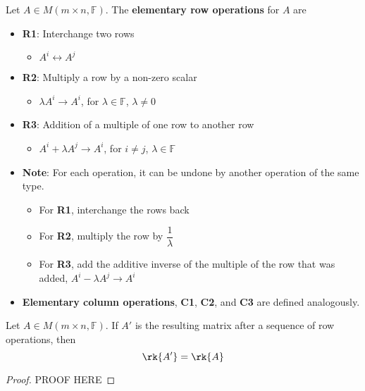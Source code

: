\documentclass[letterpaper,12pt]{article}
\begin{document}
\begin{definition}
Let $A \in M(m \times n, \mathbb{F})$. The \textbf{elementary row operations} for $A$ are
\begin{itemize}
    \item \textbf{R1}: Interchange two rows
    \begin{itemize}
        \item $A^i \leftrightarrow A^j$
    \end{itemize}
    \item \textbf{R2}: Multiply a row by a non-zero scalar
    \begin{itemize}
        \item $\lambda A^i \rightarrow A^i$, for $\lambda \in \mathbb{F}$, $\lambda \neq 0$
    \end{itemize}
    \item \textbf{R3}: Addition of a multiple of one row to another row
    \begin{itemize}
        \item $A^i + \lambda A^j \rightarrow A^i$, for $i \neq j$, $ \lambda \in \mathbb{F}$
    \end{itemize}
\end{itemize}

\begin{itemize}
    \item \textbf{Note}: For each operation, it can be undone by another operation of the same type.
    \begin{itemize}
        \item For \textbf{R1}, interchange the rows back
        \item For \textbf{R2}, multiply the row by $\dfrac{1}{\lambda}$
        \item For \textbf{R3}, add the additive inverse of the multiple of the row that was added, $A^i - \lambda A^j \rightarrow A^i$
    \end{itemize}
\end{itemize}

\begin{itemize}
    \item \textbf{Elementary column operations}, \textbf{C1}, \textbf{C2}, and \textbf{C3} are defined analogously.
\end{itemize}
\end{definition}

\begin{theorem}
Let $A \in M(m \times n, \mathbb{F})$. If $A'$ is the resulting matrix after a sequence of row operations, then
\begin{equation*}
    \rk{A'} = \rk{A}
\end{equation*}
\end{theorem}
\begin{proof}
PROOF HERE
\end{proof}
\end{document}
